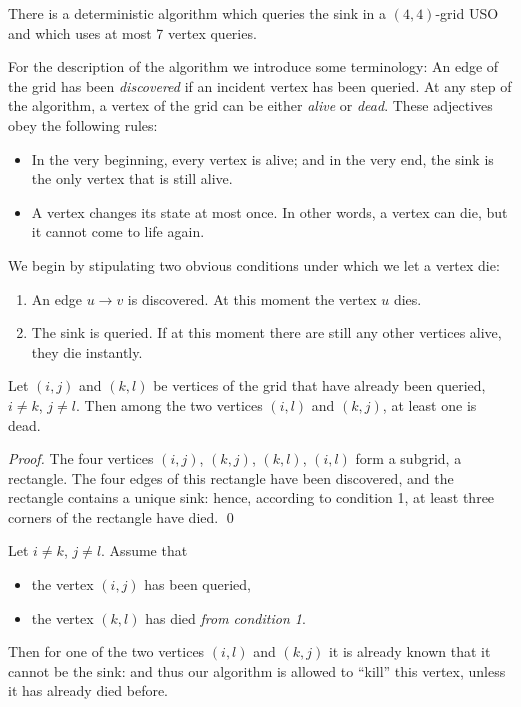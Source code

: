 \documentclass[runningheads,a4paper]{llncs}
\begin{document}
\begin{proposition}
    \label{prop:4:7}
    There is a deterministic algorithm which queries the sink in a
    $(4,4)$-grid USO and which uses at most 7 vertex queries.
\end{proposition}

For the description of the algorithm we introduce some terminology:
An edge of the grid has been \emph{discovered} if an incident vertex has been
queried.
At any step of the algorithm, a vertex of the grid can be either \emph{alive}
or \emph{dead}.
These adjectives obey the following rules:
\begin{itemize}
    \item
        In the very beginning, every vertex is alive; and in the very end, the
        sink is the only vertex that is still alive.

    \item
        A vertex changes its state at most once.
        In other words, a vertex can die, but it cannot come to life again.
\end{itemize}
We begin by stipulating two obvious conditions under which we let a vertex die:
\begin{enumerate}
    \item
        An edge $u \to v$ is discovered. At this moment the vertex $u$ dies.

    \item
        The sink is queried. If at this moment there are still any other
        vertices alive, they die instantly.
\end{enumerate}

\begin{lemma}
    Let $(i,j)$ and $(k,l)$ be vertices of the grid that have already been
    queried, $i \neq k$, $j \neq l$.
    Then among the two vertices $(i,l)$ and $(k,j)$, at least one is dead.

    \label{lem:rectangle}
\end{lemma}

\begin{proof}
    The four vertices $(i,j)$, $(k,j)$, $(k,l)$, $(i,l)$ form a subgrid, a
    rectangle.
    The four edges of this rectangle have been discovered, and the rectangle
    contains a unique sink: hence, according to condition 1, at least three
    corners of the rectangle have died. \qed
\end{proof}

\begin{lemma}
    \label{lem:kill}
    Let $i \neq k$, $j \neq l$.
    Assume that
    \begin{itemize}
        \item the vertex $(i,j)$ has been queried,
        \item the vertex $(k,l)$ has died \emph{from condition 1}.
    \end{itemize}
    Then for one of the two vertices $(i,l)$ and $(k,j)$ it is already known
    that it cannot be the sink: and thus our algorithm is allowed to ``kill''
    this vertex, unless it has already died before.
\end{lemma}
\end{document}
